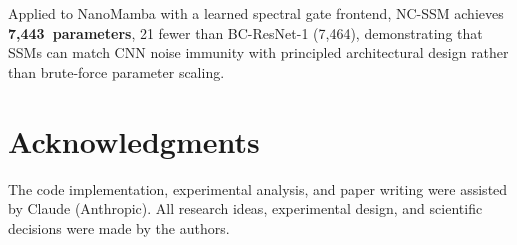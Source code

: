 \documentclass{Interspeech}
\begin{document}
Applied to NanoMamba with a learned spectral gate frontend, NC-SSM achieves \textbf{7,443~parameters}, 21 fewer than BC-ResNet-1 (7,464), demonstrating that SSMs can match CNN noise immunity with principled architectural design rather than brute-force parameter scaling.


\section*{Acknowledgments}
The code implementation, experimental analysis, and paper writing were assisted by Claude (Anthropic).
All research ideas, experimental design, and scientific decisions were made by the authors.



\end{document}
